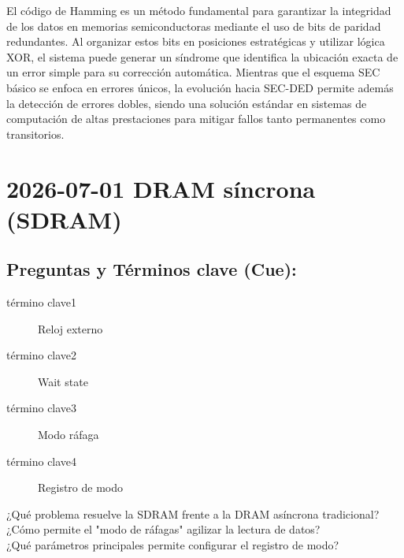 \documentclass{article}
\begin{document}
El código de Hamming es un método fundamental para garantizar la
integridad de los datos en memorias semiconductoras mediante el uso de
bits de paridad redundantes. Al organizar estos bits en posiciones
estratégicas y utilizar lógica XOR, el sistema puede generar un
síndrome que identifica la ubicación exacta de un error simple para su
corrección automática. Mientras que el esquema SEC básico se enfoca en
errores únicos, la evolución hacia SEC-DED permite además la detección
de errores dobles, siendo una solución estándar en sistemas de
computación de altas prestaciones para mitigar fallos tanto
permanentes como transitorios.

\section{2026-07-01 DRAM síncrona (SDRAM)}
\label{sec:org39cfdf8}

\subsection{Preguntas y Términos clave (Cue):}
\label{sec:org5186521}
\begin{description}
\item[{término clave1}] Reloj externo
\item[{término clave2}] Wait state
\item[{término clave3}] Modo ráfaga
\item[{término clave4}] Registro de modo
\item[{¿Qué problema resuelve la SDRAM frente a la DRAM asíncrona tradicional?}] 

\item[{¿Cómo permite el "modo de ráfagas" agilizar la lectura de datos?}] 

\item[{¿Qué parámetros principales permite configurar el registro de modo?}] 
\end{description}
\end{document}
